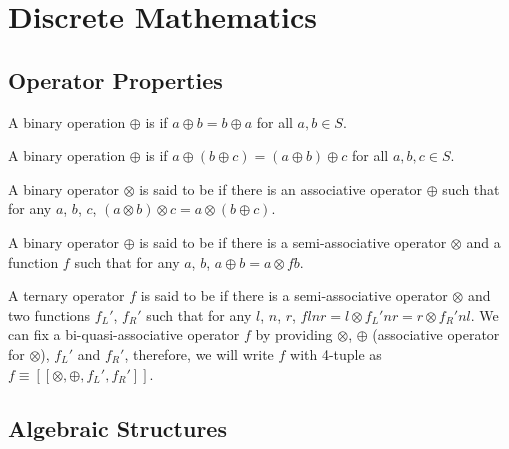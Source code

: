 \chapter{Discrete Mathematics}

\section{Operator Properties}

\begin{defi}
A binary operation $\oplus$ is  if $a\oplus b = b\oplus a$ for all $a,b\in S$.\cite{Oppliger:2011:CC:2049860}
\end{defi}

\begin{defi}
A binary operation $\oplus$ is  if $a\oplus\left(b\oplus c\right) = \left(a\oplus b\right)\oplus c$ for all $a,b,c\in S$.\cite{Oppliger:2011:CC:2049860}
\end{defi}

\begin{defi}
A binary operator $\otimes$ is said to be  if there is an associative operator $\oplus$ such that for any $a$, $b$, $c$, $\left(a\otimes b\right)\otimes c = a\otimes\left(b\oplus c\right)$.\cite{conf/europar/MatsuzakiHT03}
\end{defi}

\begin{defi}
A binary operator $\oplus$ is said to be  if there is a semi-associative operator $\otimes$ and a function $f$ such that for any $a$, $b$, $a\oplus b = a\otimes f b$.\cite{conf/europar/MatsuzakiHT03}
\end{defi}

\begin{defi}
A ternary operator $f$ is said to be  if there is a semi-associative operator $\otimes$ and two functions $f_L'$, $f_R'$ such that for any $l$, $n$, $r$, $f l n r = l \otimes f_L' n r = r \otimes f_R' n l$. We can fix a bi-quasi-associative operator $f$ by providing $\otimes$, $\oplus$ (associative operator for $\otimes$), $f_L'$ and $f_R'$, therefore, we will write $f$ with 4-tuple as $f\equiv \left[\left[\otimes,\oplus, f_L', f_R' \right]\right]$.\cite{conf/europar/MatsuzakiHT03}
\end{defi}

\section{Algebraic Structures}

